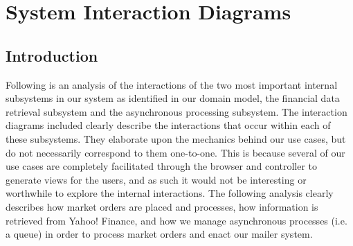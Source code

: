 \chapter{System Interaction Diagrams}


\section{Introduction}
Following is an analysis of the interactions of the two most important internal subsystems in our system as identified in our domain model, the financial data retrieval subsystem and the asynchronous processing subsystem. The interaction diagrams included clearly describe the interactions that occur within each of these subsystems. They elaborate upon the mechanics behind our use cases, but do not necessarily correspond to them one-to-one. This is because several of our use cases are completely facilitated through the browser and controller to generate views for the users, and as such it would not be interesting or worthwhile to explore the internal interactions. The following analysis clearly describes how market orders are placed and processes, how information is retrieved from Yahoo! Finance, and how we manage asynchronous processes (i.e. a queue) in order to process market orders and enact our mailer system.
 

\clearpage

